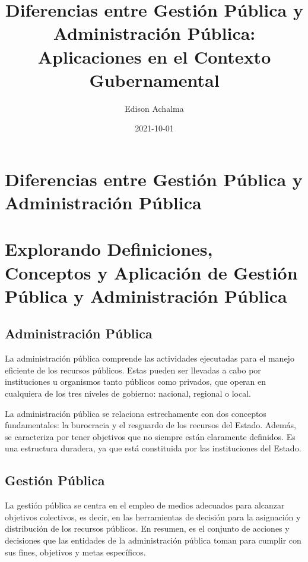 \documentclass[
  jou,
  floatsintext,
  longtable,
  a4paper,
  nolmodern,
  notxfonts,
  notimes,
  colorlinks=true,linkcolor=blue,citecolor=blue,urlcolor=blue]{apa7}
\title{Diferencias entre Gestión Pública y Administración Pública:
Aplicaciones en el Contexto Gubernamental}
\author{Edison Achalma}
\affiliation{
{Escuela Profesional de Economía, Universidad Nacional de San Cristóbal
de Huamanga}}
\date{2021-10-01}
\begin{document}
\maketitle

\hypertarget{toc}{}
\tableofcontents
\newpage
\section[Introduction]{Diferencias entre Gestión Pública y
Administración Pública}

\setcounter{secnumdepth}{-\maxdimen} %

\setlength\LTleft{0pt}


\section{Explorando Definiciones, Conceptos y Aplicación de Gestión
Pública y Administración
Pública}\label{explorando-definiciones-conceptos-y-aplicaciuxf3n-de-gestiuxf3n-puxfablica-y-administraciuxf3n-puxfablica}

\subsection{Administración Pública}\label{administraciuxf3n-puxfablica}

La administración pública comprende las actividades ejecutadas para el
manejo eficiente de los recursos públicos. Estas pueden ser llevadas a
cabo por instituciones u organismos tanto públicos como privados, que
operan en cualquiera de los tres niveles de gobierno: nacional, regional
o local.

La administración pública se relaciona estrechamente con dos conceptos
fundamentales: la burocracia y el resguardo de los recursos del Estado.
Además, se caracteriza por tener objetivos que no siempre están
claramente definidos. Es una estructura duradera, ya que está
constituida por las instituciones del Estado.

\subsection{Gestión Pública}\label{gestiuxf3n-puxfablica}

La gestión pública se centra en el empleo de medios adecuados para
alcanzar objetivos colectivos, es decir, en las herramientas de decisión
para la asignación y distribución de los recursos públicos. En resumen,
es el conjunto de acciones y decisiones que las entidades de la
administración pública toman para cumplir con sus fines, objetivos y
metas específicos.
\end{document}
